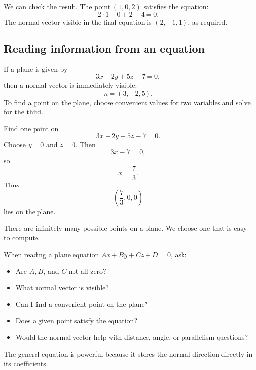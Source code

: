 We can check the result. The point \((1,0,2)\) satisfies the equation:
\[
2\cdot1-0+2-4=0.
\]
The normal vector visible in the final equation is \((2,-1,1)\), as required.

\subsection*{Reading information from an equation}

If a plane is given by
\[
3x-2y+5z-7=0,
\]
then a normal vector is immediately visible:
\[
n=(3,-2,5).
\]
To find a point on the plane, choose convenient values for two variables and solve for the third.

\begin{examplebox}
Find one point on
\[
3x-2y+5z-7=0.
\]
Choose \(y=0\) and \(z=0\). Then
\[
3x-7=0,
\]
so
\[
x=\frac73.
\]
Thus
\[
\left(\frac73,0,0\right)
\]
lies on the plane.
\end{examplebox}

There are infinitely many possible points on a plane. We choose one that is easy to compute.

\begin{summarybox}
When reading a plane equation \(Ax+By+Cz+D=0\), ask:
\begin{itemize}
\item Are \(A\), \(B\), and \(C\) not all zero?
\item What normal vector is visible?
\item Can I find a convenient point on the plane?
\item Does a given point satisfy the equation?
\item Would the normal vector help with distance, angle, or parallelism questions?
\end{itemize}
\end{summarybox}

The general equation is powerful because it stores the normal direction directly in its coefficients.